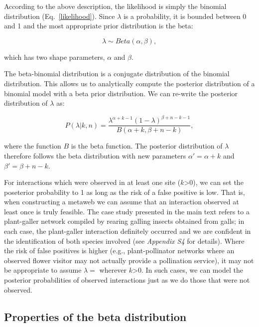 \documentclass[12pt]{article}
\begin{document}
    According to the above description, the likelihood is simply the binomial distribution (Eq.~\ref{likelihood}). Since $\lambda$ is a probability, it is bounded between 0 and 1 and the most appropriate prior distribution is the beta:

    \begin{equation}
      \lambda \sim Beta(\alpha,\beta) , \label{prior}
    \end{equation}

    \noindent which has two shape parameters, $\alpha$ and $\beta$. 

   The beta-binomial distribution is a conjugate distribution of the binomial distribution. This allows us to analytically compute the posterior distribution of a binomial model with a beta prior distribution. We can re-write the posterior distribution of $\lambda$ as:

    \begin{equation}
      P(\lambda|k,n) = \frac{\lambda^{\alpha+k-1}(1-\lambda)^{\beta+n-k-1}}{B(\alpha+k,\beta+n-k)} , \label{posterior2}
    \end{equation}

    
    \noindent where the function $B$ is the beta function. The posterior distribution of $\lambda$ therefore follows the beta distribution with new parameters $\alpha'= \alpha+k$ and $\beta'=\beta+n-k$. 


    For interactions which were observed in at least one site ($k$\textgreater$0$), we can set the poseterior probability to 1 as long as the risk of a false positive is low. That is, when constructing a metaweb we can assume that an interaction observed at least once is truly feasible. The case study presented in the main text refers to a plant-galler network compiled by rearing galling insects obtained from galls; in each case, the plant-galler interaction definitely occurred and we are confident in the identification of both species involved (see \emph{Appendix S4} for details). Where the risk of false positives is higher (e.g., plant-pollinator networks where an observed flower visitor may not actually provide a pollination service), it may not be appropriate to assume $\lambda=$ wherever $k$\textgreater$0$. In such cases, we can model the posterior probabilities of observed interactions just as we do those that were not observed.


  \subsection*{Properties of the beta distribution}
  
\end{document}
